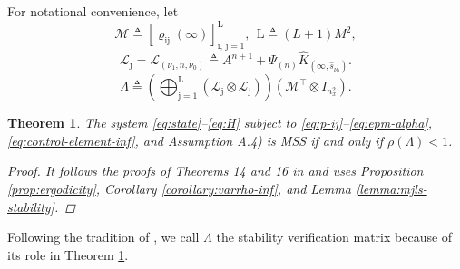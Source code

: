 \documentclass[journal,twoside,web]{ieeecolor}
\newtheorem{theorem}{Theorem}
\begin{document}
For notational convenience, let 
\begin{equation}\label{eq:mathcalM}
    \mathcal{M} \triangleq \left[ \varrho_{{\mathrm{i}\mathrm{j}}}(\infty)\right]_{\mathrm{i},\,\mathrm{j}=1}^{\mathrm{L}},~~
    \mathrm{L}\triangleq (L+1)M^2,
\end{equation}
\begin{equation}\label{eq:mathcalL}
    \mathcal{L}_{\mathrm{j}} = \mathcal{L}_{({\nu_1},n,{\nu_0})} \triangleq A^{n+1} + \mathit{\Psi}_{(n)} \hat{K}_{(\infty,\hat{s}_{\nu_0})}.
\end{equation}
\begin{equation}\label{eq:Lambda}
\mathit{\Lambda} \triangleq \left( \bigoplus\nolimits_{\mathrm{j}=1}^{\mathrm{L}} 
    \left( \mathcal{L}_{\mathrm{j}} \otimes \mathcal{L}_{\mathrm{j}} \right)\right)
    \left( \mathcal{M}^{\top} \otimes I_{n_x^2} \right). %
\end{equation}
\begin{theorem}\label{theorem:stability}
    The system \eqref{eq:state}--\eqref{eq:H} subject to \eqref{eq:p-ij}--\eqref{eq:epm-alpha}, \eqref{eq:control-element-inf}, and Assumption A.4) is MSS if and only if $\rho\left(\mathit{\Lambda}\right)<1$.

    \begin{proof}
        It follows the proofs of Theorems 14 and 16 in \cite{yZL-2025-automatica} and uses Proposition \ref{prop:ergodicity}, Corollary \ref{corollary:varrho-inf}, and Lemma \ref{lemma:mjls-stability}.
    \end{proof}
\end{theorem}
Following the tradition of \cite{yZL-2025-automatica}, we call $\mathit{\Lambda}$ the stability verification matrix because of its role in Theorem \ref{theorem:stability}.
\end{document}
